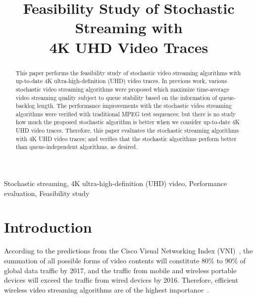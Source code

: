 \documentclass[conference]{IEEEtran}
\begin{document}
\newtheorem{thm}{Theorem}
\newtheorem{problem}{\textbf{Problem}}
\newtheorem{theorem}{\textbf{Theorem}}
\newtheorem{lemma}{\textbf{Lemma}}
\newtheorem{definition}{\textbf{Definition}}
\newtheorem{remark}{\textbf{Remark}}
\newcommand{\argmin}{\operatornamewithlimits{argmin}}
\newcommand{\argmax}{\operatornamewithlimits{argmax}}

\title{Feasibility Study of Stochastic Streaming with \\ 4K UHD Video Traces}
\author{
}
\maketitle

\begin{abstract}
This paper performs the feasibility study of stochastic video streaming algorithms with up-to-date 4K ultra-high-definition (UHD) video traces.
In previous work, various stochastic video streaming algorithms were proposed which maximize time-average video streaming quality subject to queue stability based on the information of queue-backlog length.
The performance improvements with the stochastic video streaming algorithms were verified with traditional MPEG test sequences; but there is no study how much the proposed stochastic algorithm is better when we consider up-to-date 4K UHD video traces.
Therefore, this paper evaluates the stochastic streaming algorithms with 4K UHD video traces; and verifies that the stochastic algorithms perform better than queue-independent algorithms, as desired.
\end{abstract}

\begin{keywords}
Stochastic streaming, 4K ultra-high-definition (UHD) video, Performance evaluation, Feasibility study
\end{keywords}

\IEEEpeerreviewmaketitle

\section{Introduction}\label{sec:intro}
According to the predictions from the Cisco Visual Networking Index (VNI)~\cite{cisco2013}, the summation of all possible forms of video contents will constitute 80\% to 90\% of global data traffic by 2017, and the traffic from mobile and wireless portable devices will exceed the traffic from wired devices by 2016.
Therefore, efficient wireless video streaming algorithms are of the highest importance~\cite{cm2013golrezaei}.
\end{document}
